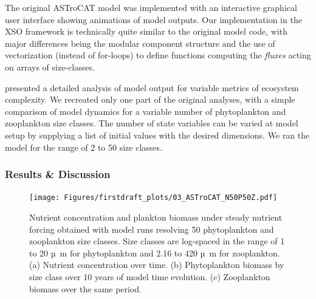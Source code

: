 \documentclass[journal abbreviation, manuscript]{copernicus}
\begin{document}
The original ASTroCAT model was implemented with an interactive graphical user interface showing animations of model outputs. Our implementation in the XSO framework is technically quite similar to the original model code, with major differences being the modular component structure and the use of vectorization (instead of for-loops) to define functions computing the \textit{fluxes} acting on arrays of size-classes.

\citet{Banas2011b} presented a detailed analysis of model output for variable metrics of ecosystem complexity. We recreated only one part of the original analyses, with a simple comparison of model dynamics for a variable number of phytoplankton and zooplankton size classes. The number of state variables can be varied at model setup by supplying a list of initial values with the desired dimensions. We ran the model for the range of 2 to 50 size classes.

\subsubsection{Results \& Discussion}
\begin{figure}[t]
\texttt{[image: Figures/firstdraft\_plots/03\_ASTroCAT\_N50P50Z.pdf]}
\caption{Nutrient concentration and plankton biomass under steady nutrient forcing obtained with model runs resolving 50 phytoplankton and zooplankton size classes. Size classes are log-spaced in the range of 1 to 20 \unit{µ m} for phytoplankton and 2.16 to 420 \unit{µ m} for zooplankton. (a) Nutrient concentration over time. (b) Phytoplankton biomass by size class over 10 years of model time evolution. (c) Zooplankton biomass over the same period.}
\label{Figure:ResultsASTroCAT_1}
\end{figure}
\end{document}
